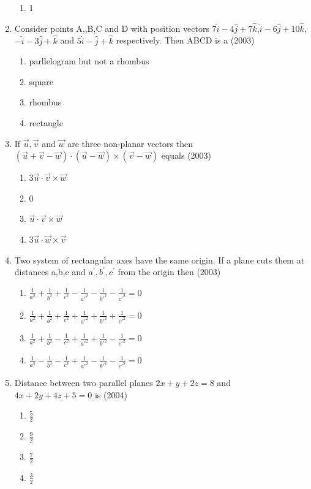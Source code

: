 \documentclass[12pt]{article}
\providecommand{\brak}[1]{\ensuremath{\left(#1\right)}}
\begin{document}
\begin{enumerate}
\begin{enumerate}
\item 1
\end{enumerate}
\item  Consider points A,,B,C and D  with position vectors $7\hat{i}-4\hat{j}+7\hat{k}$,$\hat{i}-6\hat{j}+10\hat{k}$,$-\hat{i}-3\hat{j}+\hat{k}$ and $5\hat{i}-\hat{j}+\hat{k}$ respectively. Then ABCD is a (2003)
\begin{enumerate}
\item parllelogram but not a rhombus
\item square
\item rhombus
\item rectangle
\end{enumerate}
\item If $\vec{u},\vec{v}$ and $\vec{w}$ are three non-planar vectors then $\brak{\vec{u}+\vec{v}-\vec{w}}\cdot\brak{\vec{u}-\vec{w}}\times\brak{\vec{v}-\vec{w}}$ equals (2003)
\begin{enumerate}
\item $3\vec{u}\cdot\vec{v}\times\vec{w}$
\item 0
\item $\vec{u}\cdot\vec{v}\times\vec{w}$
\item $3\vec{u}\cdot\vec{w}\times\vec{v}$
\end{enumerate}
\item Two system of rectangular axes have the same origin. If a plane cuts them at distances a,b,c and $a^{'},b^{'},c^{'}$ from the origin then (2003)
\begin{enumerate}
\item $\frac{1}{a^2}+\frac{1}{b^2}+\frac{1}{c^2}-\frac{1}{a'^2}-\frac{1}{b'^2}-\frac{1}{c'^2}=0$
\item $\frac{1}{a^2}+\frac{1}{b^2}+\frac{1}{c^2}+\frac{1}{a'^2}+\frac{1}{b'^2}+\frac{1}{c'^2}=0$
\item $\frac{1}{a^2}+\frac{1}{b^2}-\frac{1}{c^2}+\frac{1}{a'^2}+\frac{1}{b'^2}-\frac{1}{c'^2}=0$
\item $\frac{1}{a^2}-\frac{1}{b^2}-\frac{1}{c^2}+\frac{1}{a'^2}-\frac{1}{b'^2}-\frac{1}{c'^2}=0$
\end{enumerate}
\item Distance between two parallel planes $2x+y+2z=8$ and $4x+2y+4z+5=0$ is (2004)
\begin{enumerate}
\item $\frac{5}{2}$
\item $\frac{9}{2}$
\item $\frac{7}{2}$
\item $\frac{3}{2}$

\end{enumerate}
\end{enumerate}
\end{document}

